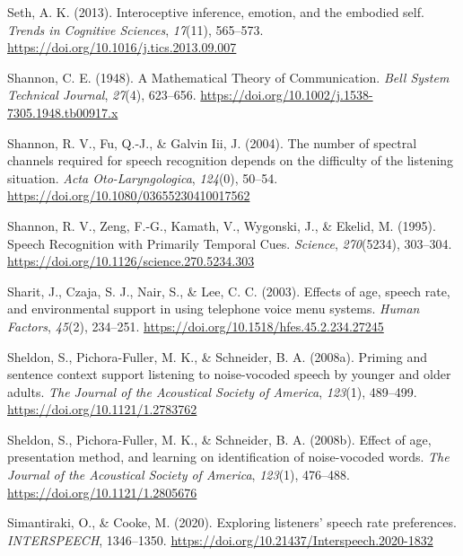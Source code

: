 \documentclass[a4paper, nobind]{templates/ociamthesis}
\newlength{\cslhangindent}
\newenvironment{CSLReferences}[2] %
 {%
  \setlength{\parindent}{0pt}
  \ifodd #1
  \let\oldpar\par
  \def\par{\hangindent=\cslhangindent\oldpar}
  \fi
  \setlength{\parskip}{1mm}
  \setlength{\baselineskip}{6mm}
 }%
 {}
\begin{document}
\begin{CSLReferences}{1}{0}
\leavevmode{}%
Seth, A. K. (2013). Interoceptive inference, emotion, and the embodied self. \emph{Trends in Cognitive Sciences}, \emph{17}(11), 565--573. \url{https://doi.org/10.1016/j.tics.2013.09.007}

\leavevmode{}%
Shannon, C. E. (1948). A Mathematical Theory of Communication. \emph{Bell System Technical Journal}, \emph{27}(4), 623--656. \url{https://doi.org/10.1002/j.1538-7305.1948.tb00917.x}

\leavevmode{}%
Shannon, R. V., Fu, Q.-J., \& Galvin Iii, J. (2004). {The number of spectral channels required for speech recognition depends on the difficulty of the listening situation}. \emph{Acta Oto-Laryngologica}, \emph{124}(0), 50--54. \url{https://doi.org/10.1080/03655230410017562}

\leavevmode{}%
Shannon, R. V., Zeng, F.-G., Kamath, V., Wygonski, J., \& Ekelid, M. (1995). Speech Recognition with Primarily Temporal Cues. \emph{Science}, \emph{270}(5234), 303--304. \url{https://doi.org/10.1126/science.270.5234.303}

\leavevmode{}%
Sharit, J., Czaja, S. J., Nair, S., \& Lee, C. C. (2003). {Effects of age, speech rate, and environmental support in using telephone voice menu systems}. \emph{Human Factors}, \emph{45}(2), 234--251. \url{https://doi.org/10.1518/hfes.45.2.234.27245}

\leavevmode{}%
Sheldon, S., Pichora-Fuller, M. K., \& Schneider, B. A. (2008a). Priming and sentence context support listening to noise-vocoded speech by younger and older adults. \emph{The Journal of the Acoustical Society of America}, \emph{123}(1), 489--499. \url{https://doi.org/10.1121/1.2783762}

\leavevmode{}%
Sheldon, S., Pichora-Fuller, M. K., \& Schneider, B. A. (2008b). Effect of age, presentation method, and learning on identification of noise-vocoded words. \emph{The Journal of the Acoustical Society of America}, \emph{123}(1), 476--488. \url{https://doi.org/10.1121/1.2805676}

\leavevmode{}%
Simantiraki, O., \& Cooke, M. (2020). {Exploring listeners' speech rate preferences}. \emph{INTERSPEECH}, 1346--1350. \url{https://doi.org/10.21437/Interspeech.2020-1832}


\end{CSLReferences}
\end{document}
